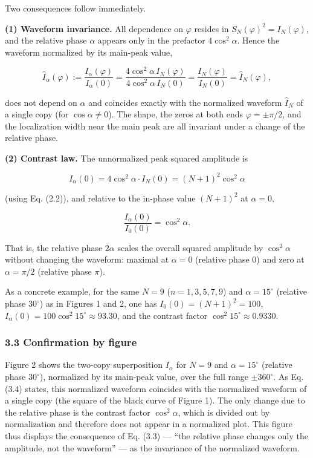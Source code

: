 \documentclass[
]{ltjsarticle}
\begin{document}
Two consequences follow immediately.

\textbf{(1) Waveform invariance.} All dependence on \(\varphi\) resides
in \(S_N(\varphi)^2=I_N(\varphi)\), and the relative phase \(\alpha\)
appears only in the prefactor \(4\cos^2\!\alpha\). Hence the waveform
normalized by its main-peak value,

\[
\widehat{I}_\alpha(\varphi):=\frac{I_\alpha(\varphi)}{I_\alpha(0)}
=\frac{4\cos^2\!\alpha\,I_N(\varphi)}{4\cos^2\!\alpha\,I_N(0)}
=\frac{I_N(\varphi)}{I_N(0)}=\widehat{I}_N(\varphi),
\tag{3.4}
\]

does not depend on \(\alpha\) and coincides exactly with the normalized
waveform \(\widehat{I}_N\) of a single copy (for \(\cos\alpha\neq0\)).
The shape, the zeros at both ends \(\varphi=\pm\pi/2\), and the
localization width near the main peak are all invariant under a change
of the relative phase.

\textbf{(2) Contrast law.} The unnormalized peak squared amplitude is

\[
I_\alpha(0)=4\cos^2\!\alpha\cdot I_N(0)=(N+1)^2\cos^2\!\alpha
\tag{3.5}
\]

(using Eq. (2.2)), and relative to the in-phase value \((N+1)^2\) at
\(\alpha=0\),

\[
\frac{I_\alpha(0)}{I_0(0)}=\cos^2\!\alpha.
\tag{3.6}
\]

That is, the relative phase \(2\alpha\) scales the overall squared
amplitude by \(\cos^2\!\alpha\) without changing the waveform: maximal
at \(\alpha=0\) (relative phase \(0\)) and zero at \(\alpha=\pi/2\)
(relative phase \(\pi\)).

As a concrete example, for the same \(N=9\) (\(n=1,3,5,7,9\)) and
\(\alpha=15^\circ\) (relative phase \(30^\circ\)) as in Figures 1 and 2,
one has \(I_0(0)=(N+1)^2=100\),
\(I_\alpha(0)=100\cos^2 15^\circ\approx 93.30\), and the contrast factor
\(\cos^2 15^\circ\approx 0.9330\).

\subsubsection{3.3 Confirmation by figure}\label{confirmation-by-figure}

Figure 2 shows the two-copy superposition \(I_\alpha\) for \(N=9\) and
\(\alpha=15^\circ\) (relative phase \(30^\circ\)), normalized by its
main-peak value, over the full range \(\pm 360^\circ\). As Eq. (3.4)
states, this normalized waveform coincides with the normalized waveform
of a single copy (the square of the black curve of Figure 1). The only
change due to the relative phase is the contrast factor
\(\cos^2\!\alpha\), which is divided out by normalization and therefore
does not appear in a normalized plot. This figure thus displays the
consequence of Eq. (3.3) --- ``the relative phase changes only the
amplitude, not the waveform'' --- as the invariance of the normalized
waveform.
\end{document}
